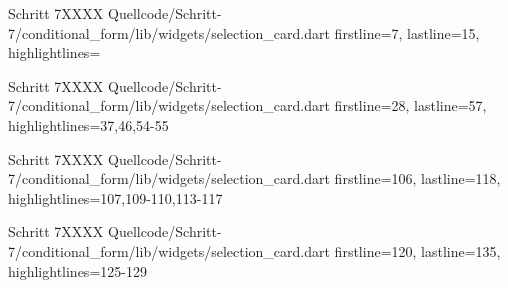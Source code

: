   \begin{alexlisting}{Schritt 7}{XXXX}
    {Quellcode/Schritt-7/conditional_form/lib/widgets/selection_card.dart}
    {firstline=7, lastline=15, highlightlines={}}
    \label{lst:Schritt6XXXX}
\end{alexlisting}
\begin{alexlisting}{Schritt 7}{XXXX}
    {Quellcode/Schritt-7/conditional_form/lib/widgets/selection_card.dart}
    {firstline=28, lastline=57, highlightlines={37,46,54-55}}
    \label{lst:Schritt6XXXX}
\end{alexlisting}
\begin{alexlisting}{Schritt 7}{XXXX}
    {Quellcode/Schritt-7/conditional_form/lib/widgets/selection_card.dart}
    {firstline=106, lastline=118, highlightlines={107,109-110,113-117}}
    \label{lst:Schritt6XXXX}
\end{alexlisting}

\begin{alexlisting}{Schritt 7}{XXXX}
    {Quellcode/Schritt-7/conditional_form/lib/widgets/selection_card.dart}
    {firstline=120, lastline=135, highlightlines={125-129}}
    \label{lst:Schritt6XXXX}
\end{alexlisting} 

\clearpage 
